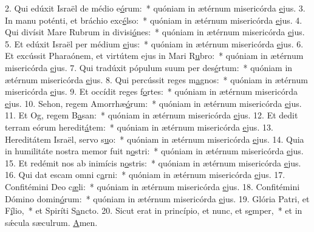 2. Qui edúxit Israël de médio e\uline{ó}rum:~* quóniam in ætérnum misericórda \uline{e}jus.
3. In manu poténti, et bráchio exc\uline{é}lso:~* quóniam in ætérnum misericórda \uline{e}jus.
4. Qui divísit Mare Rubrum in divisi\uline{ó}nes:~* quóniam in ætérnum misericórda \uline{e}jus.
5. Et edúxit Israël per médium \uline{e}jus:~* quóniam in ætérnum misericórda \uline{e}jus.
6. Et excússit Pharaónem, et virtútem ejus in Mari R\uline{u}bro:~* quóniam in ætérnum misericórda \uline{e}jus.
7. Qui tradúxit pópulum suum per des\uline{é}rtum:~* quóniam in ætérnum misericórda \uline{e}jus.
8. Qui percússit reges m\uline{a}gnos:~* quóniam in ætérnum misericórda \uline{e}jus.
9. Et occídit reges f\uline{o}rtes:~* quóniam in ætérnum misericórda \uline{e}jus.
10. Sehon, regem Amorrhæ\uline{ó}rum:~* quóniam in ætérnum misericórda \uline{e}jus.
11. Et Og, regem B\uline{a}san:~* quóniam in ætérnum misericórda \uline{e}jus.
12. Et dedit terram eórum heredit\uline{á}tem:~* quóniam in ætérnum misericórda \uline{e}jus.
13. Hereditátem Israël, servo s\uline{u}o:~* quóniam in ætérnum misericórda \uline{e}jus.
14. Quia in humilitáte nostra memor fuit n\uline{o}stri:~* quóniam in ætérnum misericórda \uline{e}jus.
15. Et redémit nos ab inimícis n\uline{o}stris:~* quóniam in ætérnum misericórda \uline{e}jus.
16. Qui dat escam omni c\uline{a}rni:~* quóniam in ætérnum misericórda \uline{e}jus.
17. Confitémini Deo c\uline{æ}li:~* quóniam in ætérnum misericórda \uline{e}jus.
18. Confitémini Dómino domin\uline{ó}rum:~* quóniam in ætérnum misericórda \uline{e}jus.
19. Glória Patri, et F\uline{í}lio,~* et Spiríti S\uline{a}ncto.
20. Sicut erat in princípio, et nunc, et s\uline{e}mper,~* et in sǽcula sæculrum. \uline{A}men.
